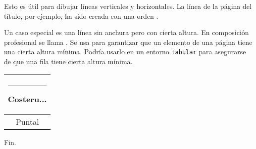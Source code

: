 Esto es útil para dibujar líneas verticales y horizontales. La línea de la página del título, por ejemplo, ha sido creada con una orden .

Un caso especial es una línea sin anchura pero con cierta altura.  En composición profesional se llama .  Se usa para garantizar que un elemento de una página tiene una cierta altura mínima.  Podría usarlo en un entorno \texttt{tabular} para asegurarse de que una fila tiene cierta altura mínima.

\begin{example}
\begin{tabular}{|c|}
\hline
\rule{1pt}{4ex}Costeru...\\
\hline
\rule{0pt}{4ex}Puntal\\
\hline
\end{tabular}
\end{example}

\bigskip
{\flushright Fin.\par}

